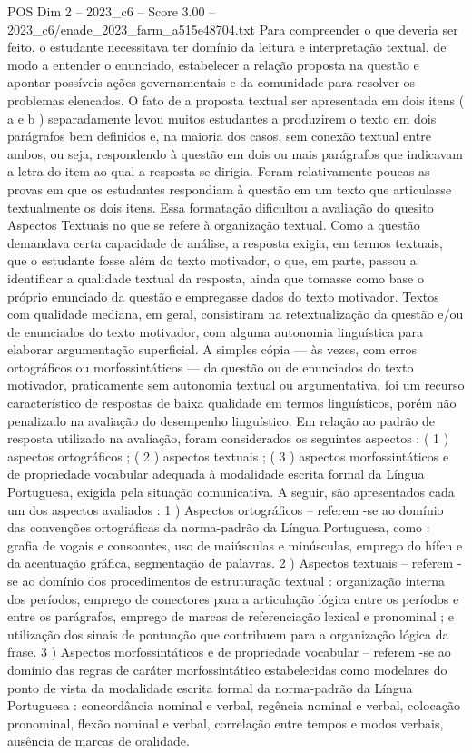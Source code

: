 \begin{textsample}{POS Dim 2 – 2023\_c6 – Score 3.00 – 2023\_c6/enade\_2023\_farm\_a515e48704.txt}
Para compreender o que deveria ser feito, o estudante necessitava ter domínio da leitura e interpretação textual, de modo a entender o enunciado, estabelecer a relação proposta na questão e apontar possíveis ações governamentais e da comunidade para resolver os problemas elencados.
O fato de a proposta textual ser apresentada em dois itens ( a e b ) separadamente levou muitos estudantes a produzirem o texto em dois parágrafos bem definidos e, na maioria dos casos, sem conexão textual entre ambos, ou seja, respondendo à questão em dois ou mais parágrafos que indicavam a letra do item ao qual a resposta se dirigia.
Foram relativamente poucas as provas em que os estudantes respondiam à questão em um texto que articulasse textualmente os dois itens.
Essa formatação dificultou a avaliação do quesito Aspectos Textuais no que se refere à organização textual.
Como a questão demandava certa capacidade de análise, a resposta exigia, em termos textuais, que o estudante fosse além do texto motivador, o que, em parte, passou a identificar a qualidade textual da resposta, ainda que tomasse como base o próprio enunciado da questão e empregasse dados do texto motivador.
Textos com qualidade mediana, em geral, consistiram na retextualização da questão e/ou de enunciados do texto motivador, com alguma autonomia linguística para elaborar argumentação superficial.
A simples cópia — às vezes, com erros ortográficos ou morfossintáticos — da questão ou de enunciados do texto motivador, praticamente sem autonomia textual ou argumentativa, foi um recurso característico de respostas de baixa qualidade em termos linguísticos, porém não penalizado na avaliação do desempenho linguístico.
Em relação ao padrão de resposta utilizado na avaliação, foram considerados os seguintes aspectos : ( 1 ) aspectos ortográficos ; ( 2 ) aspectos textuais ; ( 3 ) aspectos morfossintáticos e de propriedade vocabular adequada à modalidade escrita formal da Língua Portuguesa, exigida pela situação comunicativa.
A seguir, são apresentados cada um dos aspectos avaliados : 1 ) Aspectos ortográficos – referem -se ao domínio das convenções ortográficas da norma-padrão da Língua Portuguesa, como : grafia de vogais e consoantes, uso de maiúsculas e minúsculas, emprego do hífen e da acentuação gráfica, segmentação de palavras. 2 ) Aspectos textuais – referem -se ao domínio dos procedimentos de estruturação textual : organização interna dos períodos, emprego de conectores para a articulação lógica entre os períodos e entre os parágrafos, emprego de marcas de referenciação lexical e pronominal ; e utilização dos sinais de pontuação que contribuem para a organização lógica da frase. 3 ) Aspectos morfossintáticos e de propriedade vocabular – referem -se ao domínio das regras de caráter morfossintático estabelecidas como modelares do ponto de vista da modalidade escrita formal da norma-padrão da Língua Portuguesa : concordância nominal e verbal, regência nominal e verbal, colocação pronominal, flexão nominal e verbal, correlação entre tempos e modos verbais, ausência de marcas de oralidade.

\end{textsample}
